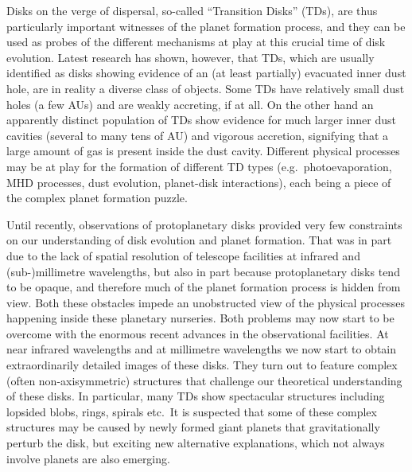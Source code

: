 \documentclass[10pt,fleqn,twoside]{article}
\begin{document}
Disks on the verge of dispersal, so-called ``Transition Disks'' (TDs),  are thus particularly important
witnesses of the planet formation process, and they can be used
as probes of the different mechanisms at play at this crucial time of
disk evolution. Latest research has shown, however, that TDs, which are usually
identified as disks showing evidence of an (at least partially)
evacuated inner dust hole, are in reality a diverse class of
objects. Some TDs have relatively small dust holes (a few AUs) and are
weakly accreting, if at all. On the other hand an apparently distinct
population of TDs show evidence for much larger inner dust cavities
(several to many tens of AU) and vigorous accretion, signifying that a
large amount of gas is present inside the dust cavity. Different
physical processes may be at play for the formation of different TD
types (e.g.\ photoevaporation, MHD processes, dust evolution, planet-disk interactions),
each being a piece of the complex planet formation puzzle. 

Until recently, observations of protoplanetary disks provided very few
constraints on our understanding of disk evolution and planet formation. That was in part due
to the lack of spatial resolution of telescope facilities at infrared and
(sub-)millimetre wavelengths, but also in part because protoplanetary disks
tend to be opaque, and therefore much of the planet formation process is
hidden from view. Both these obstacles impede an unobstructed view of the
physical processes happening inside these planetary nurseries. Both problems may now start to
be overcome with the enormous recent advances in the observational
facilities. At near infrared wavelengths and at millimetre wavelengths we
now start to obtain extraordinarily detailed images of these disks. They
turn out to feature complex (often non-axisymmetric) structures that
challenge our theoretical understanding of these disks. In particular,
many TDs show spectacular structures including lopsided blobs, rings,
spirals etc.\ It is suspected 
that some of these complex structures may be caused by newly formed giant
planets that gravitationally perturb the disk, but exciting new
alternative explanations, which not always involve planets are also emerging. 
\end{document}
